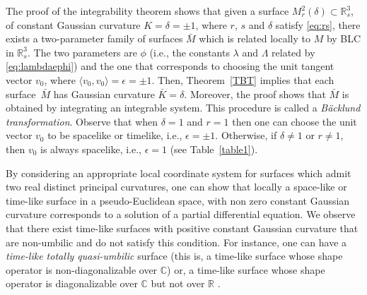 \documentclass[pdftex]{sigma}
\numberwithin{equation}{section}
\begin{document}
\begin{Remark}%
{\rm The proof of the integrability theorem shows that given a surface $M_r^2(\delta)\subset{\mathbb{R}}^3_s$, of constant Gaussian curvature $K=\delta=\pm 1$, where $r$, $s$ and $\delta$ satisfy \eqref{eq:rs}, there exists a two-parameter family of surfaces $\bar{M}$ which is related locally to $M$ by BLC in ${\mathbb{R}}^3_s$. The two parameters are $\phi$ (i.e., the constants $\lambda$ and $\Lambda$ related by
\eqref{eq:lambdaephi}) and the one that corresponds to choosing the unit tangent vector ${v}_0$, where
$\langle v_0,v_0\rangle=\epsilon=\pm 1$. Then, Theorem~\ref{TBT} implies that each surface~$\bar{M}$ has Gaussian curvature $\bar{K}=\delta$. Moreover, the proof shows that $\bar{M}$ is obtained by integrating an integrable system.
This procedure is called a \textit{B\"acklund transformation}.
Observe that when $\delta=1$ and $r=1$ then one can choose the unit vector $v_0$ to be spacelike or timelike, i.e., $\epsilon=\pm 1$. Otherwise, if $\delta\neq 1$ or $r\neq 1$, then $v_0$ is always spacelike, i.e., $\epsilon =1$ (see Table~\ref{table1})}.
\end{Remark}

By considering an appropriate local coordinate system for surfaces which admit two real distinct principal curvatures, one can show \cite{KRT2022} that locally a space-like or time-like surface in a pseudo-Euclidean space, with non zero constant Gaussian curvature corresponds to a solution of a partial differential equation.
We observe that there exist time-like surfaces with positive constant Gaussian curvature that are non-umbilic and do not satisfy this condition. For instance, one can have a \textit{time-like totally quasi-umbilic} surface \cite{Clelland2012} (this is, a time-like surface whose shape operator is non-diagonalizable over $\mathbb{C}$) or, a time-like surface whose shape operator is diagonalizable over $\mathbb{C}$ but not over ${\mathbb{R}}$ \cite{Gu--Hu--Inoguchi2002}.
\end{document}
